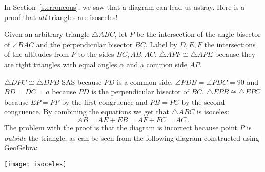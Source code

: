 In Section~\ref{s.erroneous}, we saw that a diagram can lead us astray. Here is a proof that \emph{all} triangles are isosceles!
\begin{center}
\end{center}
Given an arbitrary triangle $\triangle ABC$, let $P$ be the intersection of the angle bisector of $\angle BAC$ and the perpendicular bisector $BC$. Label by $D,E,F$ the intersections of the altitudes from $P$ to the sides $BC, AB,AC$. $\triangle APF\cong \triangle APE$ because they are right triangles with equal angles $\alpha$ and a common side $AP$.

$\triangle DPC\cong \triangle DPB$ SAS because $PD$ is a common side, $\angle PDB=\angle PDC=90$ and $BD=DC=a$ because $PD$ is the perpendicular bisector of $BC$. $\triangle EPB\cong \triangle EPC$ because $EP=PF$ by the first congruence and $PB=PC$ by the second congruence. By combining the equations we get that $\triangle ABC$ is isoceles:
\[
AB= AE+EB=AF+FC =AC\,.
\]
The problem with the proof is that the diagram is incorrect because point $P$ is \emph{outside} the triangle, as can be seen from the following diagram constructed using GeoGebra:
\begin{center}
\texttt{[image: isoceles]}
\end{center}

